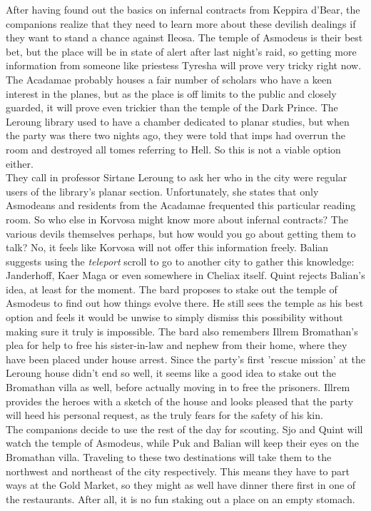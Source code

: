 After having found out the basics on infernal contracts from Keppira d'Bear, the companions realize that they need to learn more about these devilish dealings if they want to stand a chance against Ileosa. The temple of Asmodeus is their best bet, but the place will be in state of alert after last night's raid, so getting more information from someone like priestess Tyresha will prove very tricky right now. The Acadamae probably houses a fair number of scholars who have a keen interest in the planes, but as the place is off limits to the public and closely guarded, it will prove even trickier than the temple of the Dark Prince. The Leroung library used to have a chamber dedicated to planar studies, but when the party was there two nights ago, they were told that imps had overrun the room and destroyed all tomes referring to Hell. So this is not a viable option either.\\

They call in professor Sirtane Leroung to ask her who in the city were regular users of the library's planar section. Unfortunately, she states that only Asmodeans and residents from the Acadamae frequented this particular reading room. So who else in Korvosa might know more about infernal contracts? The various devils themselves perhaps, but how would you go about getting them to talk? No, it feels like Korvosa will not offer this information freely. Balian suggests using the {\itshape teleport} scroll to go to another city to gather this knowledge: Janderhoff, Kaer Maga or even somewhere in Cheliax itself. Quint rejects Balian's idea, at least for the moment. The bard proposes to stake out the temple of Asmodeus to find out how things evolve there. He still sees the temple as his best option and feels it would be unwise to simply dismiss this possibility without making sure it truly is impossible. The bard also remembers Illrem Bromathan's plea for help to free his sister-in-law and nephew from their home, where they have been placed under house arrest. Since the party's first 'rescue mission' at the Leroung house didn't end so well, it seems like a good idea to stake out the Bromathan villa as well, before actually moving in to free the prisoners. Illrem provides the heroes with a sketch of the house and looks pleased that the party will heed his personal request, as the truly fears for the safety of his kin.\\

The companions decide to use the rest of the day for scouting. Sjo and Quint will watch the temple of Asmodeus, while Puk and Balian will keep their eyes on the Bromathan villa. Traveling to these two destinations will take them to the northwest and northeast of the city respectively. This means they have to part ways at the Gold Market, so they might as well have dinner there first in one of the restaurants. After all, it is no fun staking out a place on an empty stomach.\\

